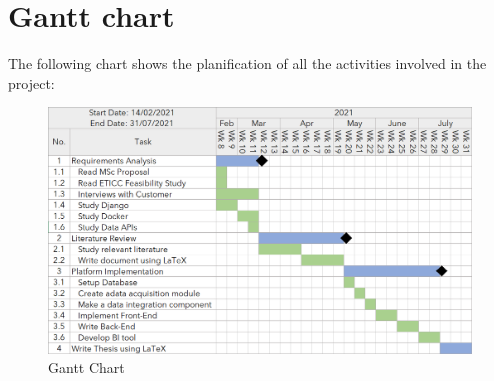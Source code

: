 \newpage
\section{Gantt chart}
The following chart shows the planification of all the activities involved in the project:

\begin{figure}[H]
	\centering
	\includegraphics[scale=0.55]{img/gantt.png}
	\caption{Gantt Chart}
\end{figure} 
